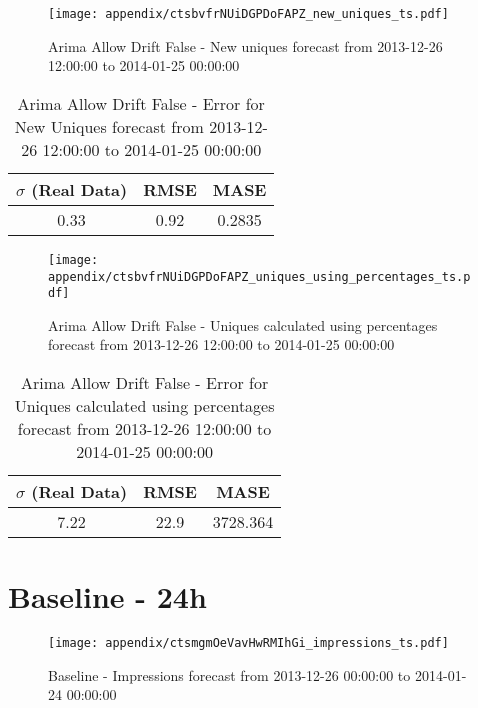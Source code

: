 \begin{figure}[H] \begin{center} \leavevmode
\texttt{[image: appendix/ctsbvfrNUiDGPDoFAPZ\_new\_uniques\_ts.pdf]} \caption{
Arima Allow Drift False - New uniques forecast from 2013-12-26 12:00:00 to 2014-01-25 00:00:00} \label{fig:appendix/ctsbvfrNUiDGPDoFAPZ_new_uniques_ts.pdf} \end{center}
\end{figure}

\begin{table}[H]
\centering
\footnotesize
\begin{tabular}{ccc}
$\sigma$ (Real Data) & RMSE & MASE   \\ \hline
0.33 & 0.92 & 0.2835 \\
\end{tabular}

\vspace{0.5cm}

\caption{
Arima Allow Drift False - Error for New Uniques forecast from 2013-12-26 12:00:00 to 2014-01-25 00:00:00}
\end{table}

\begin{figure}[H] \begin{center} \leavevmode
\texttt{[image: appendix/ctsbvfrNUiDGPDoFAPZ\_uniques\_using\_percentages\_ts.pdf]} \caption{
Arima Allow Drift False - Uniques calculated using percentages forecast from 2013-12-26 12:00:00 to 2014-01-25 00:00:00} \label{fig:appendix/ctsbvfrNUiDGPDoFAPZ_uniques_using_percentages_ts.pdf} \end{center}
\end{figure}

\begin{table}[H]
\centering
\footnotesize
\begin{tabular}{ccc}
$\sigma$ (Real Data) & RMSE & MASE   \\ \hline
7.22 & 22.9 & 3728.364 \\
\end{tabular}

\vspace{0.5cm}

\caption{
Arima Allow Drift False - Error for Uniques calculated using percentages forecast from 2013-12-26 12:00:00 to 2014-01-25 00:00:00}
\end{table}

\section{Baseline - 24h}
\begin{figure}[H] \begin{center} \leavevmode
\texttt{[image: appendix/ctsmgmOeVavHwRMIhGi\_impressions\_ts.pdf]} \caption{
Baseline - Impressions forecast from 2013-12-26 00:00:00 to 2014-01-24 00:00:00} \label{fig:appendix/ctsmgmOeVavHwRMIhGi_impressions_ts.pdf} \end{center}
\end{figure}

